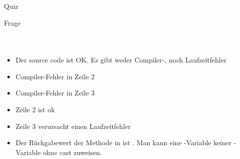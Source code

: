 \documentclass[usepdftitle=false,hyperref={pdfpagelabels=false}]{beamer}
\begin{document}
\begin{frame}{Quiz}
    \begin{block}{Frage}
    \begin{minipage}[b]{0.45\linewidth}
        \inputminted[linenos=false, numbersep=5pt, tabsize=4, fontsize=\tiny]{java}{Basket.java}
    \end{minipage}
    \hspace{0.5cm}
    \begin{minipage}[b]{0.45\linewidth}
        \inputminted[linenos=false, numbersep=5pt, tabsize=4, fontsize=\tiny,]{java}{Fruit.java}
        \inputminted[linenos=true, numbersep=5pt, tabsize=4, fontsize=\tiny, label=In main, frame=lines]{java}{Generics-quiz-main.java}
    \end{minipage}
    \end{block}

    \begin{overprint}
    \begin{itemize}
        \item Der source code ist OK. Es gibt weder Compiler-, noch Laufzeitfehler
        \item Compiler-Fehler in Zeile 2
        \item Compiler-Fehler in Zeile 3
    \end{itemize}
        \begin{itemize}
            \item Zeile 2 ist ok
            \item Zeile 3 verursacht einen Laufzeitfehler
            \item Der Rückgabewert der Methode 
                 in  ist .
                 Man kann eine -Variable
                 keiner -Variable ohne cast zuweisen.
        \end{itemize}
    \end{overprint}
\end{frame}
\end{document}
